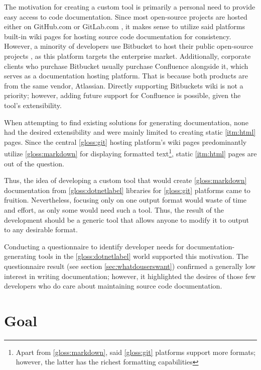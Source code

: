 The motivation for creating a custom tool is primarily a personal need to provide easy access to code documentation. Since most open-source projects are hosted either on GitHub.com or GitLab.com \cite{alphabet_inc_google_2022}, it makes sense to utilize said platforms built-in wiki pages for hosting source code documentation for consistency. However, a minority of developers use Bitbucket to host their public open-source projects \cite{jiricek_why_2022}, as this platform targets the enterprise market. Additionally, corporate clients who purchase Bitbucket usually purchase Confluence alongside it, which serves as a documentation hosting platform. That is because both products are from the same vendor, Atlassian. Directly supporting Bitbuckets wiki is not a priority; however, adding future support for Confluence is possible, given the tool's extensibility.

When attempting to find existing solutions for generating documentation, none had the desired extensibility and were mainly limited to creating static \ref{itm:html} pages.
Since the central \ref{gloss:git} hosting platform's wiki pages predominantly utilize \ref{gloss:markdown} for displaying formatted text\footnote{Apart from \ref{gloss:markdown}, said \ref{gloss:git} platforms support more formats; however, the latter has the richest formatting capabilities}, static \ref{itm:html} pages are out of the question.

Thus, the idea of developing a custom tool that would create \ref{gloss:markdown} documentation from \ref{gloss:dotnetlabel} libraries for \ref{gloss:git} platforms came to fruition. Nevertheless, focusing only on one output format would waste of time and effort, as only some would need such a tool. Thus, the result of the development should be a generic tool that allows anyone to modify it to output to any desirable format.

Conducting a questionnaire to identify developer needs for documentation-generating tools in the \ref{gloss:dotnetlabel} world supported this motivation. The questionnaire result (see section \ref{sec:whatdouserswant}) confirmed a generally low interest in writing documentation; however, it highlighted the desires of those few developers who do care about maintaining source code documentation.

\section*{Goal}

